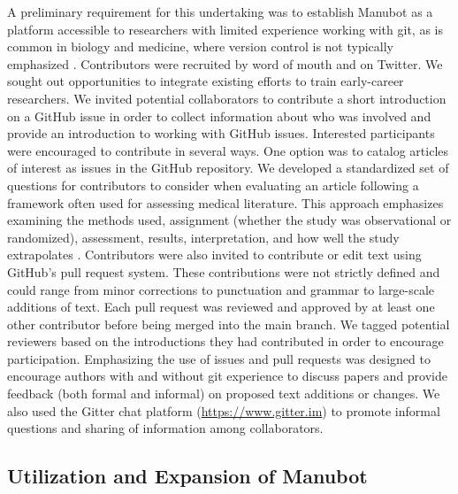 \documentclass[twocolumn]{ceurart}
\begin{document}
A preliminary requirement for this undertaking was to establish Manubot as a platform accessible to researchers with limited experience working with git, as is common in biology and medicine, where version control is not typically emphasized \citep{1HmO21gZN, OO1DuZd, 4ny1onB0}.
Contributors were recruited by word of mouth and on Twitter.
We sought out opportunities to integrate existing efforts to train early-career researchers.
We invited potential collaborators to contribute a short introduction on a GitHub issue in order to collect information about who was involved and provide an introduction to working with GitHub issues.
Interested participants were encouraged to contribute in several ways.
One option was to catalog articles of interest as issues in the GitHub repository.
We developed a standardized set of questions for contributors to consider when evaluating an article following a framework often used for assessing medical literature.
This approach emphasizes examining the methods used, assignment (whether the study was observational or randomized), assessment, results, interpretation, and how well the study extrapolates \citep{17OQtAY4l}.
Contributors were also invited to contribute or edit text using GitHub's pull request system.
These contributions were not strictly defined and could range from minor corrections to punctuation and grammar to large-scale additions of text.
Each pull request was reviewed and approved by at least one other contributor before being merged into the main branch.
We tagged potential reviewers based on the introductions they had contributed in order to encourage participation.
Emphasizing the use of issues and pull requests was designed to encourage authors with and without git experience to discuss papers and provide feedback (both formal and informal) on proposed text additions or changes.
We also used the Gitter chat platform (\url{https://www.gitter.im}) to promote informal questions and sharing of information among collaborators.

\hypertarget{utilization-and-expansion-of-manubot}{%
\subsection{Utilization and Expansion of Manubot}\label{utilization-and-expansion-of-manubot}}
\end{document}

